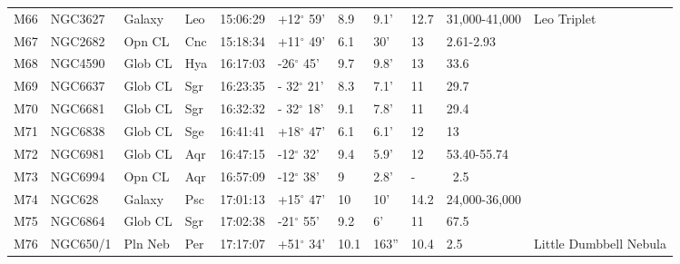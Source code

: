\documentclass[10pt,twoside,a4paper,english]{article}
\begin{document}
\begin{longtable}{@{}lllllllllll@{}}
M66        & NGC3627     & Galaxy     & Leo       & 15:06:29 & +12$^{\circ}$ 59'  & 8.9       & 9.1'                 & 12.7     & 31,000-41,000       & Leo Triplet                               \\ 
M67        & NGC2682     & Opn CL     & Cnc       & 15:18:34 & +11$^{\circ}$ 49'  & 6.1       & 30'                  & 13       & 2.61-2.93           &                                           \\ 
M68        & NGC4590     & Glob CL    & Hya       & 16:17:03 & -26$^{\circ}$ 45'  & 9.7       & 9.8'                 & 13       & 33.6                &                                           \\ 
M69        & NGC6637     & Glob CL    & Sgr       & 16:23:35 & - 32$^{\circ}$ 21' & 8.3       & 7.1'                 & 11       & 29.7                &                                           \\ 
M70        & NGC6681     & Glob CL    & Sgr       & 16:32:32 & - 32$^{\circ}$ 18' & 9.1       & 7.8'                 & 11       & 29.4                &                                           \\ 
M71        & NGC6838     & Glob CL    & Sge       & 16:41:41 & +18$^{\circ}$ 47'  & 6.1       & 6.1'                 & 12       & 13                  &                                           \\ 
M72        & NGC6981     & Glob CL    & Aqr       & 16:47:15 & -12$^{\circ}$ 32'  & 9.4       & 5.9'                 & 12       & 53.40-55.74         &                                           \\ 
M73        & NGC6994     & Opn CL     & Aqr       & 16:57:09 & -12$^{\circ}$ 38'  & 9         & 2.8'                 & -        & ~2.5                &                                           \\ 
M74        & NGC628      & Galaxy     & Psc       & 17:01:13 & +15$^{\circ}$ 47'  & 10        & 10'                  & 14.2     & 24,000-36,000       &                                           \\ 
M75        & NGC6864     & Glob CL    & Sgr       & 17:02:38 & -21$^{\circ}$ 55'  & 9.2       & 6'                   & 11       & 67.5                &                                           \\ 
M76        & NGC650/1    & Pln Neb    & Per       & 17:17:07 & +51$^{\circ}$ 34'  & 10.1      & 163''                & 10.4     & 2.5                 & Little Dumbbell Nebula                    \\ 

\end{longtable}
\end{document}
